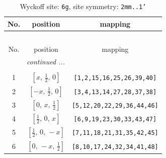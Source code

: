 \documentclass[fleqn,8pt]{jsarticle}
\begin{document}
\renewcommand{\arraystretch}{1.2}
\begin{longtable}{ccc}
\caption{Wyckoff site: {\tt 6g}, site symmetry: {\tt 2mm..1'}}
 \\
 \hline \hline
No. & position & mapping \\ \hline \endfirsthead

\multicolumn{2}{l}{\tablename\ \thetable{}} \\
 \hline \hline
No. & position & mapping \\ \hline \endhead

 \hline \hline
\multicolumn{2}{r}{\footnotesize\it continued ...} \\ \endfoot

 \hline \hline
\multicolumn{2}{r}{} \\ \endlastfoot

1 & $\left[ x,\, \frac{1}{2},\, 0 \right]$ & {\tt [1,2,15,16,25,26,39,40]} \\ \hline
2 & $\left[ - x,\, \frac{1}{2},\, 0 \right]$ & {\tt [3,4,13,14,27,28,37,38]} \\ \hline
3 & $\left[ 0,\, x,\, \frac{1}{2} \right]$ & {\tt [5,12,20,22,29,36,44,46]} \\ \hline
4 & $\left[ \frac{1}{2},\, 0,\, x \right]$ & {\tt [6,9,19,23,30,33,43,47]} \\ \hline
5 & $\left[ \frac{1}{2},\, 0,\, - x \right]$ & {\tt [7,11,18,21,31,35,42,45]} \\ \hline
6 & $\left[ 0,\, - x,\, \frac{1}{2} \right]$ & {\tt [8,10,17,24,32,34,41,48]} \\
\end{longtable}
\renewcommand{\arraystretch}{1.2}
\end{document}
